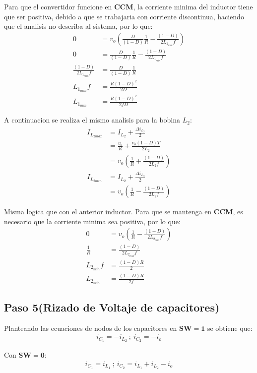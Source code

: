 Para que el convertidor funcione en \textbf{CCM}, la corriente minima del inductor tiene que ser positiva, debido a que se trabajaria con corriente discontinua,
haciendo que el analisis no describa al sistema, por lo que:
\begin{align*}
    0&=v_o\left(\frac{D}{(1-D)}\frac{1}{R}-\frac{(1-D)}{2 L_{1_{min}} f}\right) \\ 
    0&=\frac{D}{(1-D)}\frac{1}{R}-\frac{(1-D)}{2 L_{1_{min}} f} \\
    \frac{(1-D)}{2 L_{1_{min}} f}&=\frac{D}{(1-D)}\frac{1}{R} \\ 
    L_{1_{min}} f&= \frac{R(1-D)^2}{2 D} \\ 
    L_{1_{min}}&=\frac{R(1-D)^2}{2f D}
\end{align*}

A continuacion se realiza el mismo analisis para la bobina $L_2$:
\begin{align*}
    I_{L_{2max}}&=I_{L_2}+\frac{\Delta i_{L_2}}{2} \\ 
    &=\frac{v_o}{R}+\frac{v_o(1-D)T}{2L_2} \\ 
    &=v_o\left(\frac{1}{R}+\frac{(1-D)}{2L_2f}\right) \\ 
    I_{L_{2min}}&=I_{L_2}+\frac{\Delta i_{L_2}}{2} \\ 
    &=v_o\left(\frac{1}{R}-\frac{(1-D)}{2L_2f}\right)
\end{align*}

Misma logica que con el anterior inductor. Para que se mantenga en \textbf{CCM}, es necesario que la corriente minima sea positiva, por lo que:
\begin{align*}
    0&=v_o\left(\frac{1}{R}-\frac{(1-D)}{2L_{2_{min}}f}\right) \\ 
    \frac{1}{R}&=\frac{(1-D)}{2L_{2_{min}}f} \\ 
    L_{2_{min}}f&=\frac{(1-D)R}{2} \\ 
    L_{2_{min}}&=\frac{(1-D)R}{2 f}
\end{align*}

\newpage
\subsection{Paso 5(Rizado de Voltaje de capacitores)}
Planteando las ecuaciones de nodos de los capacitores en $\mathbf{SW=1}$ se obtiene que:
\begin{align*}
    i_{C_1}=-i_{L_2} \ ; \ i_{C_2}=-i_o
\end{align*}


Con $\mathbf{SW=0}$:
\begin{align*}
    i_{C_1}=i_{L_1} \ ; \ i_{C_2}=i_{L_1}+i_{L_2}-i_o 
\end{align*}

